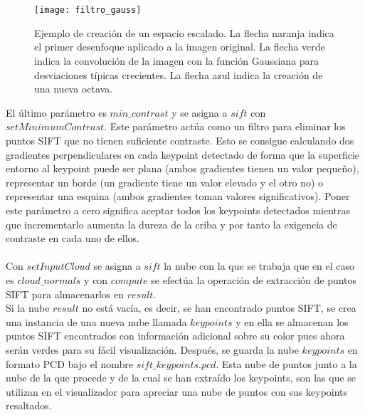 \\
\\
\begin{figure}
\centering
\texttt{[image: filtro\_gauss]}
\caption{Ejemplo de creación de un espacio escalado. La flecha naranja indica el primer desenfoque aplicado a la imagen original. La flecha verde indica la convolución de la imagen con la función Gaussiana para desviaciones típicas crecientes. La flecha azul indica la creación de una nueva octava.}\label{fig:filtro_gauss}
\end{figure}
El último parámetro es $min\_contrast$ y se asigna a $sift$ con $setMinimumContrast$. Este parámetro actúa como un filtro para eliminar los puntos SIFT que no tienen suficiente contraste. Esto se consigue calculando dos gradientes perpendiculares en cada keypoint detectado de forma que la superficie entorno al keypoint puede ser plana (ambos gradientes tienen un valor pequeño), representar un borde (un gradiente tiene un valor elevado y el otro no) o representar una esquina (ambos gradientes toman valores significativos). Poner este parámetro a cero significa aceptar todos los keypoints detectados mientras que incrementarlo aumenta la dureza de la criba y por tanto la exigencia de contraste en cada uno de ellos.
\\
\\
Con $setInputCloud$ se asigna a $sift$ la nube con la que se trabaja que en el caso es $cloud\_normals$ y con $compute$ se efectúa la operación de extracción de puntos SIFT para almacenarlos en $result$.
\\
Si la nube $result$ no está vacía, es decir, se han encontrado puntos SIFT, se crea una instancia de una nueva nube llamada $keypoints$ y en ella se almacenan los puntos SIFT encontrados con información adicional sobre su color pues ahora serán verdes para su fácil visualización. Después, se guarda la nube $keypoints$ en formato PCD bajo el nombre $sift\_keypoints.pcd$. Esta nube de puntos junto a la nube de la que procede y de la cual se han extraído los keypoints, son las que se utilizan en el visualizador para apreciar una nube de puntos con sus keypoints resaltados.
\\
\\
\iffalse
